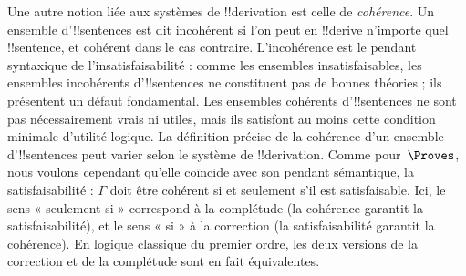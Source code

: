 \documentclass[../../../include/open-logic-section]{subfiles}
\begin{document}
Une autre notion liée aux systèmes de !!{derivation} est celle de
\emph{cohérence}. Un ensemble d'!!{sentence}s est dit incohérent si
l'on peut en !!{derive} n'importe quel !!{sentence}, et cohérent dans
le cas contraire. L'incohérence est le pendant syntaxique de
l'insatisfaisabilité : comme les ensembles insatisfaisables, les
ensembles incohérents d'!!{sentence}s ne constituent pas de bonnes
théories ; ils présentent un défaut fondamental. Les ensembles cohérents
d'!!{sentence}s ne sont pas nécessairement vrais ni utiles, mais ils
satisfont au moins cette condition minimale d'utilité logique. La
définition précise de la cohérence d'un ensemble d'!!{sentence}s peut
varier selon le système de !!{derivation}. Comme pour~$\Proves$, nous
voulons cependant qu'elle coïncide avec son pendant sémantique, la
satisfaisabilité : $\Gamma$ doit être cohérent si et seulement s'il est
satisfaisable. Ici, le sens « seulement si » correspond à la complétude
(la cohérence garantit la satisfaisabilité), et le sens « si » à la
correction (la satisfaisabilité garantit la cohérence). En logique
classique du premier ordre, les deux versions de la correction et de
la complétude sont en fait équivalentes.
\end{document}
